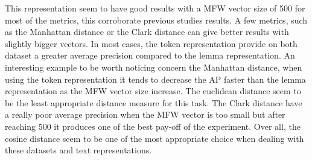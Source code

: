 This representation seem to have good results with a MFW vector size of 500 for most of the metrics, this corroborate previous studies results.
A few metrics, such as the Manhattan distance or the Clark distance can give better results with slightly bigger vectors.
In most cases, the token representation provide on both dataset a greater average precision compared to the lemma representation.
An interesting example to be worth noticing concern the Manhattan distance, when using the token representation it tends to decrease the AP faster than the lemma representation as the MFW vector size increase.
The euclidean distance seem to be the least appropriate distance measure for this task.
The Clark distance have a really poor average precision when the MFW vector is too small but after reaching 500 it produces one of the best pay-off of the experiment.
Over all, the cosine distance seem to be one of the most appropriate choice when dealing with these datasets and text representations.

